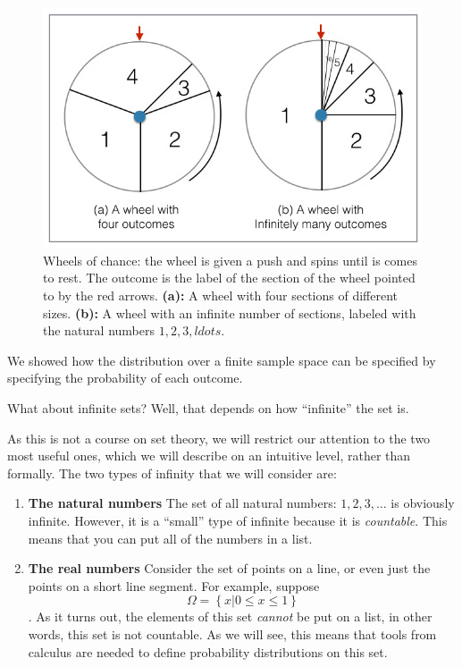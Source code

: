 \begin{figure}[th]
\begin{center}
\includegraphics[width=5in]{figs/WheelsOfChance.png}
\end{center}
\caption{Wheels of chance: the wheel is given a push and spins until
  is comes to rest. The outcome is the label of the section of the
  wheel pointed to by the red arrows. {\bf(a):} A wheel with four
  sections of different sizes. {\bf(b):} A wheel with an infinite
  number of sections, labeled with the natural numbers $1,2,3,ldots$.
\label{fig:Wheel-of-chance}}
\end{figure}



We showed how the distribution over a finite sample space can be
specified by specifying the probability of each outcome.

What about infinite sets? Well, that depends on how ``infinite'' the set is.

As this is not a course on set theory, we will restrict our attention
to the two most useful ones, which we will describe on an intuitive
level, rather than formally. The two types of infinity that we will
consider are:
\begin{enumerate}
\item {\bf The natural numbers} The set of all natural numbers:
  $1,2,3,\ldots$ is obviously infinite. However, it is a ``small''
  type of infinite because it is {\em countable}. This means that you
  can put all of the numbers in a list.
\item{\bf The real numbers} Consider the set of points on a line, or
  even just the points on a short line segment. For example, suppose 
\[ \Omega = \left\{x | 0 \leq x \leq 1 \right\} \].
  As it turns out, the elements of this set {\em cannot} be put
  on a list, in other words, this set is not countable. As we will
  see, this means that tools from calculus are needed to define
  probability distributions on this set.
\end{enumerate}

